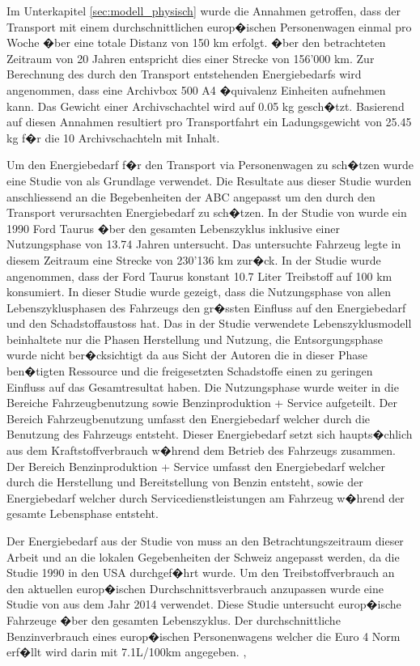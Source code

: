\documentclass[a4paper,twoside,10pt]{report}
\begin{document}
Im Unterkapitel \ref{sec:modell_physisch} wurde die Annahmen getroffen, dass der Transport mit einem durchschnittlichen europ�ischen Personenwagen einmal pro Woche �ber eine totale Distanz von 150 km erfolgt. �ber den betrachteten Zeitraum von 20 Jahren entspricht dies einer Strecke von 156'000 km. Zur Berechnung des durch den Transport entstehenden Energiebedarfs wird angenommen, dass eine Archivbox 500 A4 �quivalenz Einheiten aufnehmen kann. Das Gewicht einer Archivschachtel wird auf 0.05 kg gesch�tzt. Basierend auf diesen Annahmen resultiert pro Transportfahrt ein Ladungsgewicht von 25.45 kg f�r die 10 Archivschachteln mit Inhalt.

Um den Energiebedarf f�r den Transport via Personenwagen zu sch�tzen wurde eine Studie von \citeauthor{auto_lca} als Grundlage verwendet. Die Resultate aus dieser Studie wurden anschliessend an die Begebenheiten der ABC angepasst um den durch den Transport verursachten Energiebedarf zu sch�tzen. In der Studie von \citeauthor{auto_lca} wurde ein 1990 Ford Taurus �ber den gesamten Lebenszyklus inklusive einer Nutzungsphase von 13.74 Jahren untersucht. Das untersuchte Fahrzeug legte in diesem Zeitraum eine Strecke von 230'136 km zur�ck. In der Studie wurde angenommen, dass der Ford Taurus konstant 10.7 Liter Treibstoff auf 100 km konsumiert. In dieser Studie wurde gezeigt, dass die Nutzungsphase von allen Lebenszyklusphasen des Fahrzeugs den gr�ssten Einfluss auf den Energiebedarf und den Schadstoffaustoss hat. Das in der Studie verwendete Lebenszyklusmodell beinhaltete nur die Phasen Herstellung und Nutzung, die Entsorgungsphase wurde nicht ber�cksichtigt da aus Sicht der Autoren die in dieser Phase ben�tigten Ressource und die freigesetzten Schadstoffe einen zu geringen Einfluss auf das Gesamtresultat haben. Die Nutzungsphase wurde weiter in die Bereiche Fahrzeugbenutzung sowie Benzinproduktion + Service aufgeteilt. Der Bereich Fahrzeugbenutzung umfasst den Energiebedarf welcher durch die Benutzung des Fahrzeugs entsteht. Dieser Energiebedarf setzt sich haupts�chlich aus dem Kraftstoffverbrauch w�hrend dem Betrieb des Fahrzeugs zusammen. Der Bereich Benzinproduktion + Service umfasst den Energiebedarf welcher durch die Herstellung und Bereitstellung von Benzin entsteht, sowie der Energiebedarf welcher durch Servicedienstleistungen am Fahrzeug w�hrend der gesamte Lebensphase entsteht. \cite{auto_lca}

Der Energiebedarf aus der Studie von \citeauthor{auto_lca} muss an den Betrachtungszeitraum dieser Arbeit und an die lokalen Gegebenheiten der Schweiz angepasst werden, da die Studie 1990 in den USA durchgef�hrt wurde. Um den Treibstoffverbrauch an den aktuellen europ�ischen Durchschnittsverbrauch anzupassen wurde eine Studie von \citeauthor{auto_lca_2} aus dem Jahr 2014 verwendet. Diese Studie untersucht europ�ische Fahrzeuge �ber den gesamten Lebenszyklus. Der durchschnittliche Benzinverbrauch eines europ�ischen Personenwagens welcher die Euro 4 Norm erf�llt wird darin mit 7.1L/100km angegeben. \cite{auto_lca}, \cite{auto_lca_2}
\end{document}
